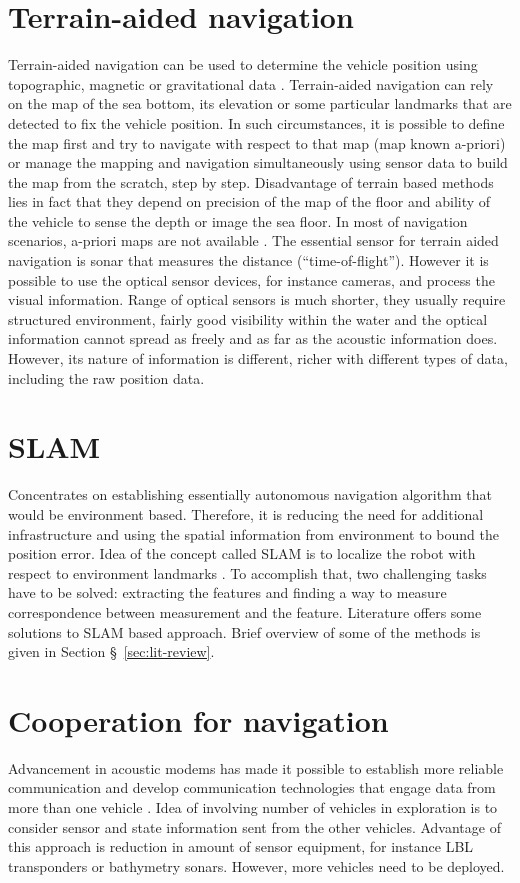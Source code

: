 \section{Terrain-aided navigation} \label{sec:terrain-aided}
Terrain-aided navigation can be used to determine the vehicle position using topographic, magnetic or gravitational data \cite{kinsey06}. Terrain-aided navigation can rely on the map of the sea bottom, its elevation or some particular landmarks that are detected to fix the vehicle position. In such circumstances, it is possible to define the map first and try to navigate with respect to that map (map known a-priori) or manage the mapping and navigation simultaneously using sensor data to build the map from the scratch, step by step. Disadvantage of terrain based methods lies in fact that they depend on precision of the map of the floor and ability of the vehicle to sense the depth or image the sea floor. In most of navigation scenarios, a-priori maps are not available \cite{kinsey06}.
The essential sensor for terrain aided navigation is sonar that measures the distance (``time-of-flight''). However it is possible to use the optical sensor devices, for instance cameras, and process the visual information. Range of optical sensors is much shorter, they usually require structured environment, fairly good visibility within the water and the optical information cannot spread as freely and as far as the acoustic information does. However, its nature of information is different, richer with different types of data, including the raw position data. 
\section{SLAM} \label{sec:slam}
Concentrates on establishing essentially autonomous navigation algorithm that would be environment based. Therefore, it is reducing the need for additional infrastructure and using the spatial information from environment to bound the position error. Idea of the concept called SLAM is to localize the robot with respect to environment landmarks \cite{ruiz01}. To accomplish that, two challenging tasks have to be solved: extracting the features and finding a way to measure correspondence between measurement and the feature. Literature offers some solutions to SLAM based approach. Brief overview of some of the methods is given in Section \S~\ref{sec:lit-review}. 
\section{Cooperation for navigation} \label{sec:cooperation}
Advancement in acoustic modems has made it possible to establish more reliable communication and develop communication technologies that engage data from more than one vehicle \cite{bahr08, fallon10}. Idea of involving number of vehicles in exploration is to consider sensor and state information sent from the other vehicles. Advantage of this approach is reduction in amount of sensor equipment, for instance LBL transponders or bathymetry sonars. However, more vehicles need to be deployed. 
